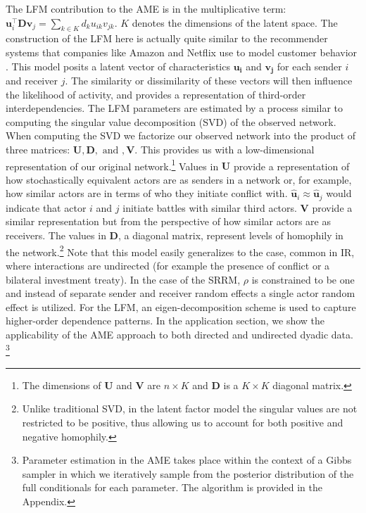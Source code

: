 The LFM contribution to the AME is in the multiplicative term: $\mathbf{u}_{i}^{\top} \mathbf{D} \mathbf{v}_{j}=\sum_{k \in K} d_{k} u_{ik} v_{jk}$. $K$ denotes the dimensions of the latent space. The construction of the LFM here is actually quite similar to the recommender systems that companies like Amazon and Netflix use to model customer behavior \citep{resnick:varian:1997,bennett:lanning:2007}. This model posits a latent vector of characteristics $\mathbf{u_{i}}$ and $\mathbf{v_{j}}$ for each sender $i$ and receiver $j$. The similarity or dissimilarity of these vectors will then influence the likelihood of activity, and provides a representation of third-order interdependencies. The LFM parameters are estimated by a process similar to computing the singular value decomposition (SVD) of the observed network. When computing the SVD we factorize our observed network into the product of three matrices: $\mathbf{U}, \mathbf{D}, \text{ and }, \mathbf{V}$. This provides us with a low-dimensional representation of our original network.\footnote{The dimensions of $\mathbf{U}$ and $\mathbf{V}$ are $n \times K$ and $\mathbf{D}$ is a $K \times K$ diagonal matrix.} Values in $\mathbf{U}$ provide a representation of how stochastically equivalent actors are as senders in a network or, for example, how similar actors are in terms of who they initiate conflict with. $\hat{\mathbf{u}}_{i} \approx \hat{\mathbf{u}}_{j}$ would indicate that actor $i$ and $j$ initiate battles with similar third actors. $\mathbf{V}$ provide a similar representation but from the perspective of how similar actors are as receivers. The values in $\mathbf{D}$, a diagonal matrix, represent levels of homophily in the network.\footnote{Unlike traditional SVD, in the latent factor model the singular values are not restricted to be positive, thus allowing us to account for both positive and negative homophily.} Note that this model easily generalizes to the case, common in IR, where interactions are undirected (for example the presence of conflict or a bilateral investment treaty). In the case of the SRRM, $\rho$ is constrained to be one and instead of separate sender and receiver random effects a single actor random effect is utilized. For the LFM, an eigen-decomposition scheme is used to capture higher-order dependence patterns. In the application section, we show the applicability of the AME approach to both directed and undirected dyadic data. \footnote{Parameter estimation in the AME takes place within the context of a Gibbs sampler in which we iteratively sample from the posterior distribution of the full conditionals for each parameter. The algorithm is provided in the Appendix.} 

